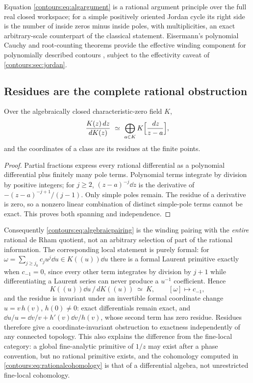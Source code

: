 \documentclass[11pt,letterpaper]{article}
\theoremstyle{definition}
\theoremstyle{remark}
\numberwithin{equation}{section}
\begin{document}
Equation \eqref{contours:eq:algargument} is a rational argument principle over the
full real closed workspace; for a simple positively oriented Jordan cycle its right
side is the number of inside zeros minus inside poles, with multiplicities, an exact
arbitrary-scale counterpart of the classical statement. Eisermann's polynomial
Cauchy and root-counting theorems provide the effective winding component for
polynomially described contours \cite{Eisermann,PR}, subject to the effectivity
caveat of \cref{contours:sec:jordan}.

\subsection{Residues are the complete rational obstruction}
\begin{proposition}
\label{contours:prop:rationalcohomology}
Over the algebraically closed characteristic-zero field $K$,
\begin{equation}\label{contours:eq:rationalcohomology}
  \frac{K(z)\,d z}{dK(z)}\ \simeq\ \bigoplus_{a\in K}K\Bigl[\frac{\,d z}{z-a}\Bigr],
\end{equation}
and the coordinates of a class are its residues at the finite points.
\end{proposition}
\begin{proof}
Partial fractions express every rational differential as a polynomial differential
plus finitely many pole terms. Polynomial terms integrate by division by positive
integers; for $j\ge2$, $(z-a)^{-j}\dd z$ is the derivative of
$-(z-a)^{-j+1}/(j-1)$. Only simple poles remain. The residue of a derivative is
zero, so a nonzero linear combination of distinct simple-pole terms cannot be exact.
This proves both spanning and independence.
\end{proof}

Consequently \eqref{contours:eq:algebraicpairing} is the winding pairing with the
\emph{entire} rational de Rham quotient, not an arbitrary selection of part of the
rational information. The corresponding local statement is purely formal: for
$\omega=\sum_{j\ge j_0}c_ju^j\dd u\in K((u))\dd u$ there is a formal Laurent
primitive exactly when $c_{-1}=0$, since every other term integrates by division by
$j+1$ while differentiating a Laurent series can never produce a $u^{-1}$
coefficient. Hence
\begin{equation}\label{contours:eq:formalresclass}
  K((u))\dd u\,\big/\,dK((u))\ \simeq\ K,\qquad[\omega]\longmapsto c_{-1},
\end{equation}
and the residue is invariant under an invertible formal coordinate change
$u=v\,h(v)$, $h(0)\ne0$: exact differentials remain exact, and
$\dd u/u=\dd v/v+h'(v)\dd v/h(v)$, whose second term has zero residue. Residues
therefore give a coordinate-invariant obstruction to exactness independently of any
connected topology. This also explains the difference from the fine-local category:
a global fine-analytic primitive of $1/z$ may exist after a phase convention, but no
rational primitive exists, and the cohomology computed in
\eqref{contours:eq:rationalcohomology} is that of a differential algebra, not
unrestricted fine-local cohomology.
\end{document}
